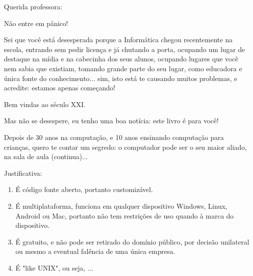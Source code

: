 \begin{multicols}{2}
\large Querida professora:

Não entre em pânico!

\normalsize

	
Sei que você está desesperada porque a Informática chegou recentemente na escola, entrando sem pedir licença e já chutando a porta, ocupando um lugar de destaque na mídia e na cabecinha dos seus alunos, ocupando lugares que você nem sabia que existiam, tomando grande parte do seu lugar, como educadora e única fonte do conhecimento... sim, isto está te causando muitos problemas, e acredite: estamos apenas começando!

Bem vindas ao século XXI.

Mas não se desespere, eu tenho uma boa notícia: este livro é para você!

Depois de 30 anos na computação, e 10 anos ensinando computação para crianças, quero te contar um segredo: o computador pode ser o seu maior aliado, na sala de aula (continua)...

Justificativa:

\begin{enumerate}
	\item É código fonte aberto, portanto customizável.
	\item É multiplataforma, funciona em qualquer dispositivo Windows, Linux, Android ou Mac, portanto não tem restrições de uso quando à marca do dispositivo.
	\item É gratuito, e não pode ser retirado do domínio público, por decisão unilateral ou mesmo a eventual falência de uma única empresa.
	\item É "like UNIX", ou seja, ...
\end{enumerate}


\end{multicols}
\vfill\null
\pagebreak
